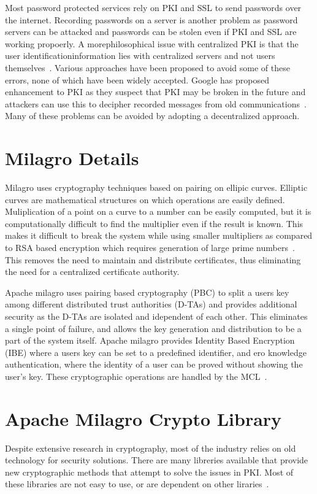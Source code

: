 Most password protected services rely on PKI and SSL to send passwords
over the internet. Recording passwords on a server is another problem
as password servers can be attacked and passwords can be stolen even
if PKI and SSL are working propoerly. A morephilosophical issue with
centralized PKI is that the user identificationinformation lies with
centralized servers and not users
themselves~\cite{distlab-pki-problems}.  Various approaches have been
proposed to avoid some of these errors, none of which have been widely
accepted. Google has proposed enhancement to PKI as they suspect that
PKI may be broken in the future and attackers can use this to decipher
recorded messages from old
communications~\cite{securityweek-ssl-threats}.  Many of these
problems can be avoided by adopting a decentralized approach.


\section{Milagro Details}
Milagro uses cryptography techniques based on pairing on ellipic
curves. Elliptic curves are mathematical structures on which
operations are easily defined. Muliplication of a point on a curve to
a number can be easily computed, but it is computationally difficult
to find the multiplier even if the result is known. This makes it
difficult to break the system while using smaller multipliers as
compared to RSA based encryption which requires generation of large
prime numbers~\cite{milagro-concepts}. This removes the need to
maintain and distribute certificates, thus eliminating the need for a
centralized certificate authority.

Apache milagro uses pairing based cryptography (PBC) to split a users
key among different distributed trust authorities (D-TAs) and provides
additional security as the D-TAs are isolated and idependent of each
other. This eliminates a single point of failure, and allows the key
generation and distribution to be a part of the system itself. Apache
milagro provides Identity Based Encryption (IBE) where a users key can
be set to a predefined identifier, and ero knowledge authentication,
where the identity of a user can be proved without showing the user's
key.  These cryptographic operations are handled by the
MCL~\cite{milagro-concepts}.

\section{Apache Milagro Crypto Library}
Despite extensive research in cryptography, most of the industry
relies on old technology for security solutions. There are many
libreries available that provide new cryptographic methods that
attempt to solve the issues in PKI. Most of these libraries are not
easy to use, or are dependent on other
liraries~\cite{mcl-white-paper}.

